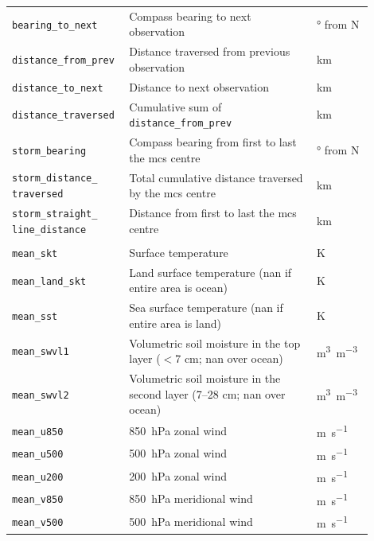 {\begin{longtable}{>{\raggedright\arraybackslash}p{0.25\linewidth} p{0.50\linewidth} >{\raggedright\arraybackslash}p{0.15\linewidth}}
    \texttt{bearing\_to\_next} & Compass bearing to next observation & \unit{\degree} from  N \\
    \texttt{distance\_from\_prev} & Distance traversed from previous observation & \unit{\km} \\
    \texttt{distance\_to\_next} & Distance to next observation & \unit{\km} \\
    \texttt{distance\_traversed} & Cumulative sum of \texttt{distance\_from\_prev} & \unit{\km} \\
    \texttt{storm\_bearing} & Compass bearing from first to last the \acrshort{mcs} centre & \unit{\degree} from  N \\
    \texttt{storm\_distance\_ traversed} & Total cumulative distance traversed by the \acrshort{mcs} centre & \unit{\km} \\
    \texttt{storm\_straight\_ line\_distance} & Distance from first to last the \acrshort{mcs} centre & \unit{\km} \\
    \midrule
    \multicolumn{3}{c}{\textit{\acrshort{era5} meteorological features}} \\
    \midrule
    \texttt{mean\_skt} & Surface temperature & \unit{\kelvin} \\
    \texttt{mean\_land\_skt} & Land surface temperature (\acrshort{nan} if entire area is ocean) & \unit{\kelvin} \\
    \texttt{mean\_sst} & Sea surface temperature (\acrshort{nan} if entire area is land) & \unit{\kelvin} \\
    \texttt{mean\_swvl1} & Volumetric soil moisture in the top layer ($<$7 cm; \acrshort{nan} over ocean) & \unit{\meter\cubed\per\meter\cubed} \\
    \texttt{mean\_swvl2} & Volumetric soil moisture in the second layer (7--28 cm; \acrshort{nan} over ocean) & \unit{\meter\cubed\per\meter\cubed} \\
    \texttt{mean\_u850} & \SI{850}{\hecto\pascal} zonal wind & \unit{\meter\per\second} \\
    \texttt{mean\_u500} & \SI{500}{\hecto\pascal} zonal wind & \unit{\meter\per\second} \\
    \texttt{mean\_u200} & \SI{200}{\hecto\pascal} zonal wind & \unit{\meter\per\second} \\
    \texttt{mean\_v850} & \SI{850}{\hecto\pascal} meridional wind & \unit{\meter\per\second} \\
    \texttt{mean\_v500} & \SI{500}{\hecto\pascal} meridional wind & \unit{\meter\per\second} \\

\end{longtable}}
